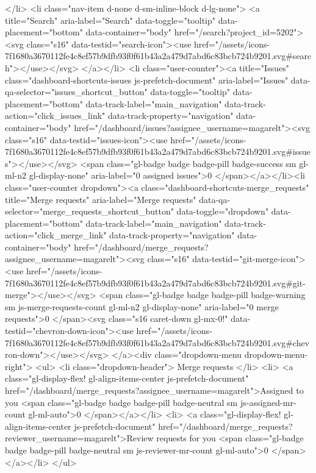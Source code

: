{{</li>
<li class="nav-item d-none d-sm-inline-block d-lg-none">
<a title="Search" aria-label="Search" data-toggle="tooltip" data-placement="bottom" data-container="body" href="/search?project_id=5202"><svg class="s16" data-testid="search-icon"><use href="/assets/icons-7f1680a3670112fe4c8ef57b9dfb93f0f61b43a2a479d7abd6c83bcb724b9201.svg#search"></use></svg>
</a></li>
<li class="user-counter"><a title="Issues" class="dashboard-shortcuts-issues js-prefetch-document" aria-label="Issues" data-qa-selector="issues_shortcut_button" data-toggle="tooltip" data-placement="bottom" data-track-label="main_navigation" data-track-action="click_issues_link" data-track-property="navigation" data-container="body" href="/dashboard/issues?assignee_username=magarelt"><svg class="s16" data-testid="issues-icon"><use href="/assets/icons-7f1680a3670112fe4c8ef57b9dfb93f0f61b43a2a479d7abd6c83bcb724b9201.svg#issues"></use></svg>
<span class="gl-badge badge badge-pill badge-success sm gl-ml-n2  gl-display-none" aria-label="0 assigned issues">0
</span></a></li><li class="user-counter dropdown"><a class="dashboard-shortcuts-merge_requests" title="Merge requests" aria-label="Merge requests" data-qa-selector="merge_requests_shortcut_button" data-toggle="dropdown" data-placement="bottom" data-track-label="main_navigation" data-track-action="click_merge_link" data-track-property="navigation" data-container="body" href="/dashboard/merge_requests?assignee_username=magarelt"><svg class="s16" data-testid="git-merge-icon"><use href="/assets/icons-7f1680a3670112fe4c8ef57b9dfb93f0f61b43a2a479d7abd6c83bcb724b9201.svg#git-merge"></use></svg>
<span class="gl-badge badge badge-pill badge-warning sm js-merge-requests-count gl-ml-n2 gl-display-none" aria-label="0 merge requests">0
</span><svg class="s16 caret-down gl-mx-0!" data-testid="chevron-down-icon"><use href="/assets/icons-7f1680a3670112fe4c8ef57b9dfb93f0f61b43a2a479d7abd6c83bcb724b9201.svg#chevron-down"></use></svg>
</a><div class="dropdown-menu dropdown-menu-right">
<ul>
<li class="dropdown-header">
Merge requests
</li>
<li>
<a class="gl-display-flex! gl-align-items-center js-prefetch-document" href="/dashboard/merge_requests?assignee_username=magarelt">Assigned to you
<span class="gl-badge badge badge-pill badge-neutral sm js-assigned-mr-count gl-ml-auto">0
</span></a></li>
<li>
<a class="gl-display-flex! gl-align-items-center js-prefetch-document" href="/dashboard/merge_requests?reviewer_username=magarelt">Review requests for you
<span class="gl-badge badge badge-pill badge-neutral sm js-reviewer-mr-count gl-ml-auto">0
</span></a></li>
</ul>
}}
